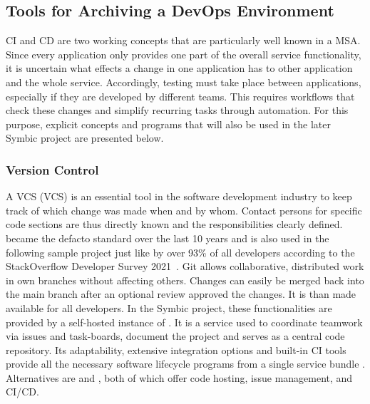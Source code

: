 \documentclass[12pt, a4paper]{article}
\begin{document}
    \subsection{Tools for Archiving a DevOps Environment}\label{ssec::getting_devops}
    \acl{CI} and \acl{CD} are two working concepts that are particularly well known in a \ac{MSA}. Since every application only provides one part of the overall service functionality, it is uncertain what effects a change in one application has to other application and the whole service. Accordingly, testing must take place between applications, especially if they are developed by different teams. This requires workflows that check these changes and simplify recurring tasks through automation.  For this purpose, explicit concepts and programs that will also be used in the later Symbic project are presented below.

        \subsubsection{Version Control}
        A \acl{VCS} (\ac{VCS}) is an essential tool in the software development industry to keep track of which change was made when and by whom. Contact persons for specific code sections are thus directly known and the responsibilities clearly defined.  became the defacto standard over the last 10 years and is also used in the following sample project just like by over 93\% of all developers according to the StackOverflow Developer Survey 2021~\cite{stackoverflow2018}. Git allows collaborative, distributed work in own branches without affecting others. Changes can easily be merged back into the main branch after an optional review approved the changes. It is than made available for all developers. In the Symbic project, these functionalities are provided by a self-hosted instance of . It is a service used to coordinate teamwork via issues and task-boards, document the project and serves as a central code repository. Its adaptability, extensive integration options and built-in \acs{CI} tools provide all the necessary software lifecycle programs from a single service bundle \cite{gitlabdocs}. Alternatives are  and , both of which offer code hosting, issue management, and \ac{CI}/\ac{CD}.
\end{document}
